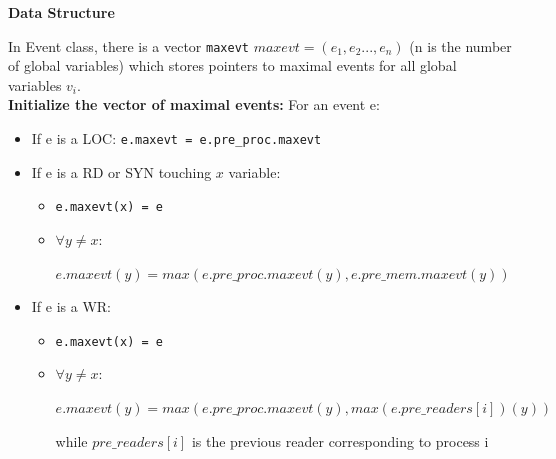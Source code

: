 \documentclass{llncs}
\begin{document}
\noindent
\textbf{Data Structure}

In Event class, there is a vector \verb!maxevt! $maxevt = (e_1, e_2...,e_n)$ (n is the number of global variables) which stores pointers to maximal events for all global variables $v_i$.\\

\noindent
\textbf{Initialize the vector of maximal events:}
For an event e:
\begin{itemize}
\item
	If e is a LOC: \verb!e.maxevt = e.pre_proc.maxevt!
\item
	If e is a RD or SYN touching $x$ variable: 
	\begin{itemize}
	\item
		\verb!e.maxevt(x) = e!
	\item	
		$\forall y \neq x$: 
		
		$e.maxevt(y) = max(e.pre\_proc.maxevt(y), e.pre\_mem.maxevt(y) )$
	\end{itemize}
\item
	If e is a WR: 
	\begin{itemize}
	\item
		\verb!e.maxevt(x) = e!
	\item	
		$\forall y \neq x$:
		
		$e.maxevt(y) = max(e.pre\_proc.maxevt(y), max(e.pre\_readers[i])(y))$
		
		while $pre\_readers[i]$ is the previous reader corresponding to process i 
		
	\end{itemize}
\end{itemize}
\end{document}
